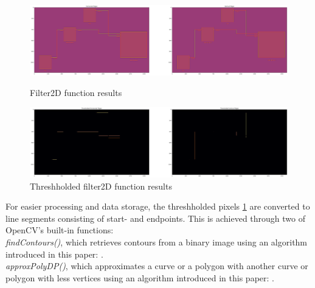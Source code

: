 \newpage

\begin{figure}[htb]
    \centering
    \includegraphics[width=1\linewidth]{Pictures/filter2D.png}
    \caption{Filter2D function results}
    \label{fig_filter2d}

    \centering
    \includegraphics[width=1\linewidth]{Pictures/threshhold.png}
    \caption{Threshholded filter2D function results}
    \label{fig_threshhold}
\end{figure}
For easier processing and data storage, the threshholded pixels \ref{fig_threshhold} are converted to line segments consisting of start- and endpoints. This is achieved through two of OpenCV's built-in functions:\\
\textit{findContours()}, which retrieves contours from a binary image using an algorithm introduced in this paper: \cite{art_findContours_algorithm}.\\
\textit{approxPolyDP()}, which approximates a curve or a polygon with another curve or polygon with less vertices using an algorithm introduced in this paper: \cite{art_approx_Poly_DP_algorithm}.
